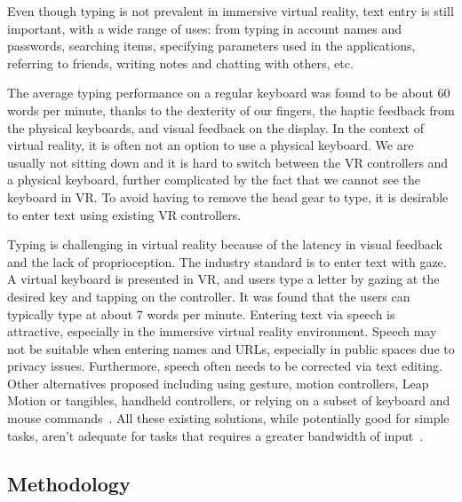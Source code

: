 Even though typing is not prevalent in immersive virtual reality, text entry is still important, with a wide range of uses: from typing in account names and passwords, searching items, specifying parameters used in the applications, referring to friends,  writing notes and chatting with others, etc.      

The average typing performance on a regular keyboard was found to be about 60 words per minute\cite{varcholik:textentry}, thanks to the dexterity of our fingers, the haptic feedback from the physical keyboards, and visual feedback on the display.    In the context of virtual reality, it is often not an option to use a physical keyboard.  We are usually not sitting down and it is hard to switch between the VR controllers and a physical keyboard, further complicated by the fact that we cannot see the keyboard in VR.  To avoid having to remove the head gear to type, it is desirable to enter text using existing VR controllers. 

Typing is challenging in virtual reality because of the latency in visual feedback and the lack of proprioception.  The industry standard is to enter text with gaze.  A virtual keyboard is presented in VR, and users type a letter by gazing at the desired key and tapping on the controller.   It was found that the users can typically type at about 7 words per minute.   Entering text via speech is attractive, especially in the immersive virtual reality environment.  Speech may not be suitable when entering names and URLs, especially in public spaces due to privacy issues.  Furthermore, speech often needs to be corrected via text editing.  Other alternatives proposed including using gesture, motion controllers, Leap Motion or tangibles, handheld controllers, or relying on a subset of keyboard and mouse commands~\cite{billinghurst1999collaborative}.
All these existing solutions, while potentially good for simple tasks, aren't adequate for tasks that requires a greater bandwidth of input~\cite{McGill:2015:DRO:2702123.2702382}.



\subsection{Methodology}

